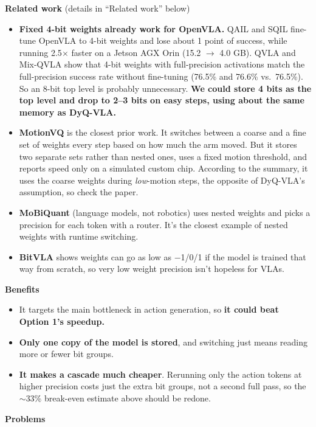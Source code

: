 \documentclass[11pt]{article}
\begin{document}
\textbf{Related work} (details in ``Related work'' below)

\begin{itemize}
\item \textbf{Fixed 4-bit weights already work for OpenVLA.} QAIL and SQIL fine-tune OpenVLA to 4-bit weights and lose about 1 point of success, while running 2.5$\times$ faster on a Jetson AGX Orin (15.2 $\rightarrow$ 4.0 GB). QVLA and Mix-QVLA show that 4-bit weights with full-precision activations match the full-precision success rate without fine-tuning (76.5\% and 76.6\% vs.~76.5\%). So an 8-bit top level is probably unnecessary. \textbf{We could store 4 bits as the top level and drop to 2--3 bits on easy steps, using about the same memory as DyQ-VLA.}
\item \textbf{MotionVQ} is the closest prior work. It switches between a coarse and a fine set of weights every step based on how much the arm moved. But it stores two separate sets rather than nested ones, uses a fixed motion threshold, and reports speed only on a simulated custom chip. According to the summary, it uses the coarse weights during \emph{low}-motion steps, the opposite of DyQ-VLA's assumption, so check the paper.
\item \textbf{MoBiQuant} (language models, not robotics) uses nested weights and picks a precision for each token with a router. It's the closest example of nested weights with runtime switching.
\item \textbf{BitVLA} shows weights can go as low as $-$1/0/1 if the model is trained that way from scratch, so very low weight precision isn't hopeless for VLAs.
\end{itemize}

\textbf{Benefits}

\begin{itemize}
\item It targets the main bottleneck in action generation, so \textbf{it could beat Option 1's speedup.}
\item \textbf{Only one copy of the model is stored}, and switching just means reading more or fewer bit groups.
\item \textbf{It makes a cascade much cheaper}. Rerunning only the action tokens at higher precision costs just the extra bit groups, not a second full pass, so the $\sim$33\% break-even estimate above should be redone.
\end{itemize}

\textbf{Problems}
\end{document}
